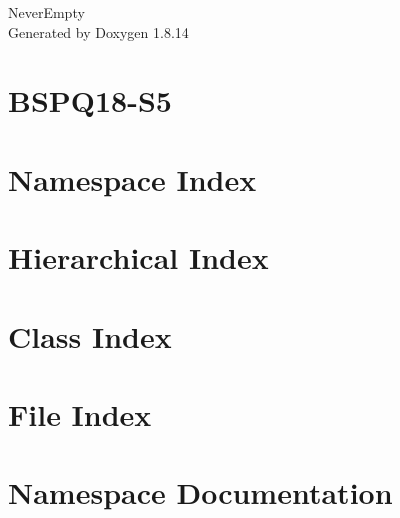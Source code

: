 \documentclass[twoside]{book}
\newcommand{\+}{\discretionary{\mbox{\scriptsize$\hookleftarrow$}}{}{}}
\newcommand{\clearemptydoublepage}{%
  \newpage{\pagestyle{empty}\cleardoublepage}%
}
\begin{document}
\hypersetup{pageanchor=false,
             bookmarksnumbered=true,
             pdfencoding=unicode
            }
\begin{titlepage}
\vspace*{7cm}
\begin{center}%
{\Large Never\+Empty }\\
\vspace*{1cm}
{\large Generated by Doxygen 1.8.14}\\
\end{center}
\end{titlepage}
\clearemptydoublepage
{}
\tableofcontents
\clearemptydoublepage
{}
\hypersetup{pageanchor=true}

\chapter{B\+S\+P\+Q18-\/\+S5}
\label{md__r_e_a_d_m_e}

\chapter{Namespace Index}

\chapter{Hierarchical Index}

\chapter{Class Index}

\chapter{File Index}

\chapter{Namespace Documentation}










\end{document}
